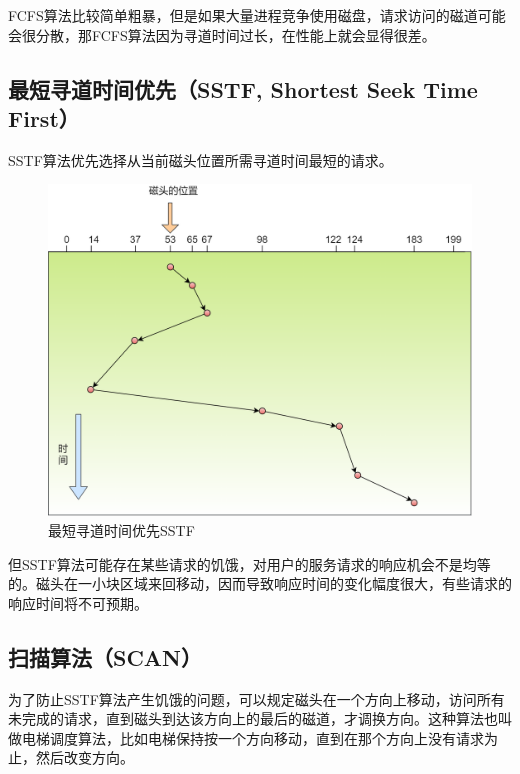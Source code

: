 FCFS算法比较简单粗暴，但是如果大量进程竞争使用磁盘，请求访问的磁道可能会很分散，那FCFS算法因为寻道时间过长，在性能上就会显得很差。

\subsection{最短寻道时间优先（SSTF, Shortest Seek Time First）}

SSTF算法优先选择从当前磁头位置所需寻道时间最短的请求。

\begin{figure}[H]
	\centering
	\includegraphics[scale=0.35]{img/C4/4-4/3.png}
	\caption{最短寻道时间优先SSTF}
\end{figure}

但SSTF算法可能存在某些请求的饥饿，对用户的服务请求的响应机会不是均等的。磁头在一小块区域来回移动，因而导致响应时间的变化幅度很大，有些请求的响应时间将不可预期。

\subsection{扫描算法（SCAN）}

为了防止SSTF算法产生饥饿的问题，可以规定磁头在一个方向上移动，访问所有未完成的请求，直到磁头到达该方向上的最后的磁道，才调换方向。这种算法也叫做电梯调度算法，比如电梯保持按一个方向移动，直到在那个方向上没有请求为止，然后改变方向。

